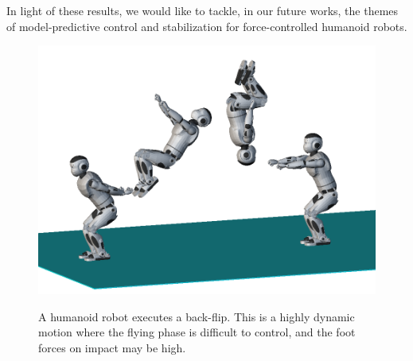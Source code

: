 In light of these results, we would like to tackle, in our future
works, the themes of model-predictive control and stabilization for
force-controlled humanoid robots.

\begin{figure}
  \centering
      {\includegraphics[width = 0.8\linewidth]
        {src/chap4-conclusion/romeo-back-flip.png}}
      \caption[A humanoid robot executes a back-flip.]{A humanoid
        robot executes a back-flip. This is a highly dynamic motion
        where the flying phase is difficult to control, and the foot
        forces on impact may be high.}
      \label{fig:chap4-romeo-back-flip}
\end{figure}
